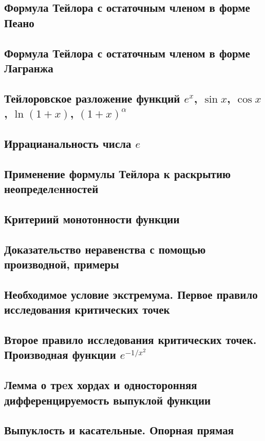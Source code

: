 \subsection{Формула Тейлора с остаточным членом в форме Пеано}

\skip
\subsection{Формула Тейлора с остаточным членом в форме Лагранжа}

\skip
\subsection{Тейлоровское разложение функций $e^x$, $\sin x$, $\cos x$, $\ln(1 + x)$, $(1 + x)^\alpha$}

\skip
\subsection{Иррацианальность числа $e$}

\skip
\subsection{Применение формулы Тейлора к раскрытию неопределeнностей}

\skip
\subsection{Критериий монотонности функции}

\skip
\subsection{Доказательство неравенства с помощью производной, примеры}

\skip
\subsection{Необходимое условие экстремума. Первое правило исследования критических точек}

\skip
\subsection{Второе правило исследования критических точек. Производная функции $e^{-1/x^2}$}

\skip
\subsection{Лемма о трeх хордах и односторонняя дифференцируемость выпуклой функции}

\skip
\subsection{Выпуклость и касательные. Опорная прямая}

\skip
